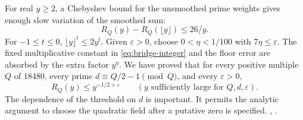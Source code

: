 For real \(y\ge2\), a Chebyshev bound for the unsmoothed prime weights gives enough slow variation of the smoothed sum:
\[
         R_Q(y)-R_Q(\lfloor y\rfloor)\le 26/y .
\]
For \(-1\le t\le0\), \(\lfloor y\rfloor^t\le2y^t\). Given \(\varepsilon>0\), choose \(0<\eta<1/100\) with \(7\eta\le\varepsilon\). The fixed multiplicative constant in \eqref{eq:bridge-integer} and the floor error are absorbed by the extra factor \(y^\eta\). We have proved that for every positive multiple \(Q\) of \(18480\), every prime \(d\equiv Q/2-1\pmod Q\), and every \(\varepsilon>0\),
\begin{equation}\label{eq:bridge-onesided}
             R_Q(y)\le y^{-1/2+\varepsilon}
                 \qquad (y\text{ sufficiently large for }Q,d,\varepsilon).
\end{equation}
The dependence of the threshold on \(d\) is important. It permits the analytic argument to choose the quadratic field after a putative zero is specified. , .
